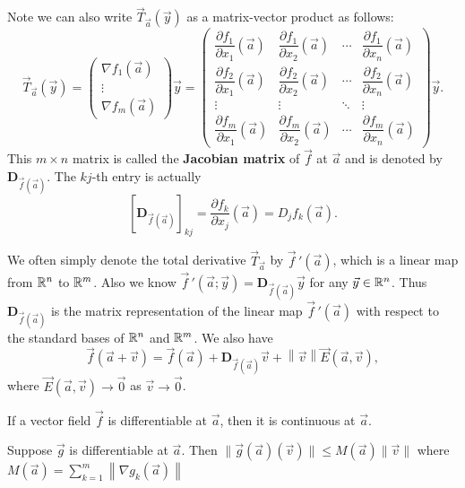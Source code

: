 \documentclass[a4paper]{ctexart}
\begin{document}
    \begin{myrmk}
        Note we can also write $\vec T_{\vec a}(\vec y)$ as a matrix-vector product as follows:
        $$ \vec T_{\vec a}(\vec y) = \begin{pmatrix}
            \nabla f_1(\vec a) \\ \vdots \\ \nabla f_m(\vec a)
        \end{pmatrix} \vec y = \begin{pmatrix}
            \dfrac{\partial f_1}{\partial x_1}(\vec a) & \dfrac{\partial f_1}{\partial x_2}(\vec a) & \cdots & \dfrac{\partial f_1}{\partial x_n}(\vec a) \\[8pt]
            \dfrac{\partial f_2}{\partial x_1}(\vec a) & \dfrac{\partial f_2}{\partial x_2}(\vec a) & \cdots & \dfrac{\partial f_2}{\partial x_n}(\vec a) \\[8pt]
                \vdots & \vdots & \ddots & \vdots \\[8pt]
            \dfrac{\partial f_m}{\partial x_1}(\vec a) & \dfrac{\partial f_m}{\partial x_2}(\vec a) & \cdots & \dfrac{\partial f_m}{\partial x_n}(\vec a)
        \end{pmatrix} \vec y. $$
        This $m\times n$ matrix is called the \textbf{Jacobian matrix} of $\vec f$ at $\vec a$ and is denoted by $\mathbf{D}_{\vec f(\vec a)}$.
        The $kj$-th entry is actually $$\left[ \mathbf{D}_{\vec f(\vec a)} \right]_{kj} = \dfrac{\partial f_k}{\partial x_j}(\vec a) = D_j f_k(\vec a).$$

        We often simply denote the total derivative $\vec T_{\vec a}$ by $\vec f\,'(\vec a)$, which is a linear map from $\mathbb{R}^n$ to $\mathbb{R}^m$. Also we know $\vec f\,'(\vec a; \vec y) = \mathbf D_{\vec f(\vec a)} \vec y$ for any $\vec y\in \mathbb{R}^n$. Thus $\mathbf D_{\vec f(\vec a)}$ is the matrix representation of the linear map $\vec f\,'(\vec a)$ with respect to the standard bases of $\mathbb{R}^n$ and $\mathbb{R}^m$. We also have
        $$ \vec f(\vec a + \vec v) = \vec f(\vec a) + \mathbf D_{\vec f(\vec a)} \vec v + \left\|\vec v\right\| \vec E(\vec a, \vec v),$$
        where $\vec E(\vec a, \vec v) \to \vec 0$ as $\vec v \to \vec 0$.
    \end{myrmk}
    \begin{mythm}
        If a vector field $\vec f$ is differentiable at $\vec a$, then it is continuous at $\vec a$.
    \end{mythm}
    \begin{mylma}
        Suppose $\vec g$ is differentiable at $\vec a$. Then $\| \vec g(\vec a) (\vec v) \| \le M(\vec a) \| \vec v\|$ where $M(\vec a)=\displaystyle \sum_{k=1}^m \left\|\nabla g_k(\vec a)\right\|$
    \end{mylma}
\end{document}
